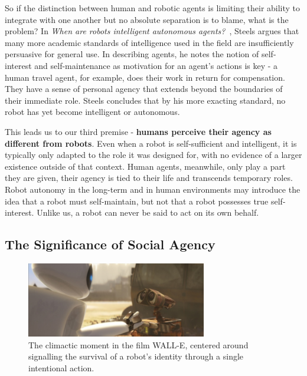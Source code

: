 \documentclass{sfuthesis}
\begin{document}
So if the distinction between human and robotic agents is limiting their ability to integrate with one another but no absolute separation is to blame, what is the problem? In \textit{When are robots intelligent autonomous agents?}~\cite{steels1995robots}, Steels argues that many more academic standards of intelligence used in the field are insufficiently persuasive for general use. In describing agents, he notes the notion of self-interest and self-maintenance as motivation for an agent's actions is key - a human travel agent, for example, does their work in return for compensation. They have a sense of personal agency that extends beyond the boundaries of their immediate role. Steels concludes that by his more exacting standard, no robot has yet become intelligent or autonomous.




This leads us to our third premise - \textbf{humans perceive their agency as different from robots}. Even when a robot is self-sufficient and intelligent, it is typically only adapted to the role it was designed for, with no evidence of a larger existence outside of that context. Human agents, meanwhile, only play a part they are given, their agency is tied to their life and transcends temporary roles. Robot autonomy in the long-term and in human environments may introduce the idea that a robot must self-maintain, but not that a robot possesses true self-interest. Unlike us, a robot can never be said to act on its own behalf.

\subsection{The Significance of Social Agency}

\begin{figure}[!b]
    \centering
    \includegraphics[width=0.7\textwidth]{walle.jpg} 

    \caption{The climactic moment in the film WALL-E, centered around signalling the survival of a robot's identity through a single intentional action.}
    \label{fig:walle}
\end{figure}
\end{document}
